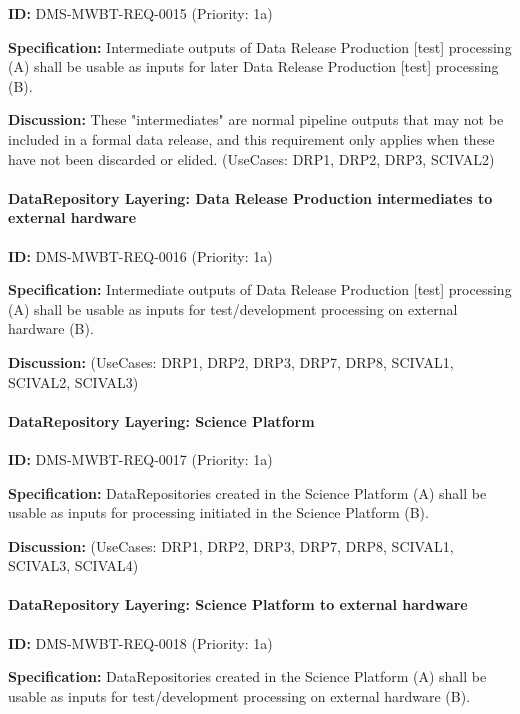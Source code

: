 \documentclass[SE,toc,lsstdraft]{lsstdoc}
\begin{document}
\label{DMS-MWBT-REQ-0015}
\textbf{ID:} DMS-MWBT-REQ-0015 (Priority: 1a)

\textbf{Specification:}
Intermediate outputs of Data Release Production [test] processing (A) shall be usable as inputs for later Data Release Production [test] processing (B).

\textbf{Discussion:}
These "intermediates" are normal pipeline outputs that may not be included in a formal data release, and this requirement only applies when these have not been discarded or elided. (UseCases: DRP1, DRP2, DRP3, SCIVAL2)

\paragraph{DataRepository Layering: Data Release Production intermediates to external hardware}\hfill  %

\label{DMS-MWBT-REQ-0016}
\textbf{ID:} DMS-MWBT-REQ-0016 (Priority: 1a)

\textbf{Specification:}
Intermediate outputs of Data Release Production [test] processing (A) shall be usable as inputs for test/development processing on external hardware (B).

\textbf{Discussion:}
(UseCases: DRP1, DRP2, DRP3, DRP7, DRP8, SCIVAL1, SCIVAL2, SCIVAL3)

\paragraph{DataRepository Layering: Science Platform}\hfill  %

\label{DMS-MWBT-REQ-0017}
\textbf{ID:} DMS-MWBT-REQ-0017 (Priority: 1a)

\textbf{Specification:}
DataRepositories created in the Science Platform (A) shall be usable as inputs for processing initiated in the Science Platform (B).

\textbf{Discussion:}
(UseCases: DRP1, DRP2, DRP3, DRP7, DRP8, SCIVAL1, SCIVAL3, SCIVAL4)

\paragraph{DataRepository Layering: Science Platform to external hardware}\hfill  %

\label{DMS-MWBT-REQ-0018}
\textbf{ID:} DMS-MWBT-REQ-0018 (Priority: 1a)

\textbf{Specification:}
DataRepositories created in the Science Platform (A) shall be usable as inputs for test/development processing on external hardware (B).
\end{document}
